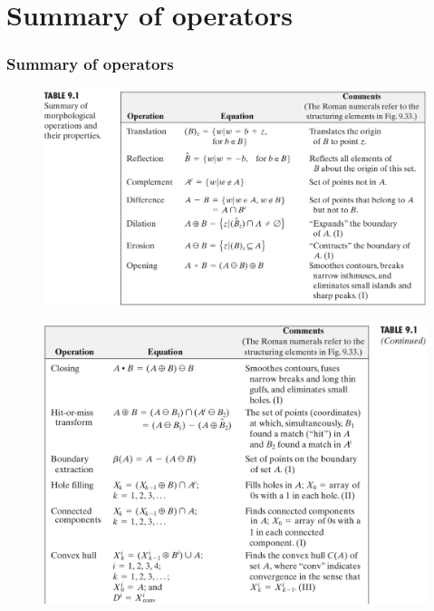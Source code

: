 \section{Summary of operators}

\begin{frame}
\frametitle{Summary of operators}
\begin{figure}[!h]
\includegraphics[width=\textwidth]{table-9-1}
\end{figure}
\end{frame}

\begin{frame}
\begin{figure}[!h]
\includegraphics[width=.8\textwidth]{table-9-1-1}
\end{figure}
\end{frame}


